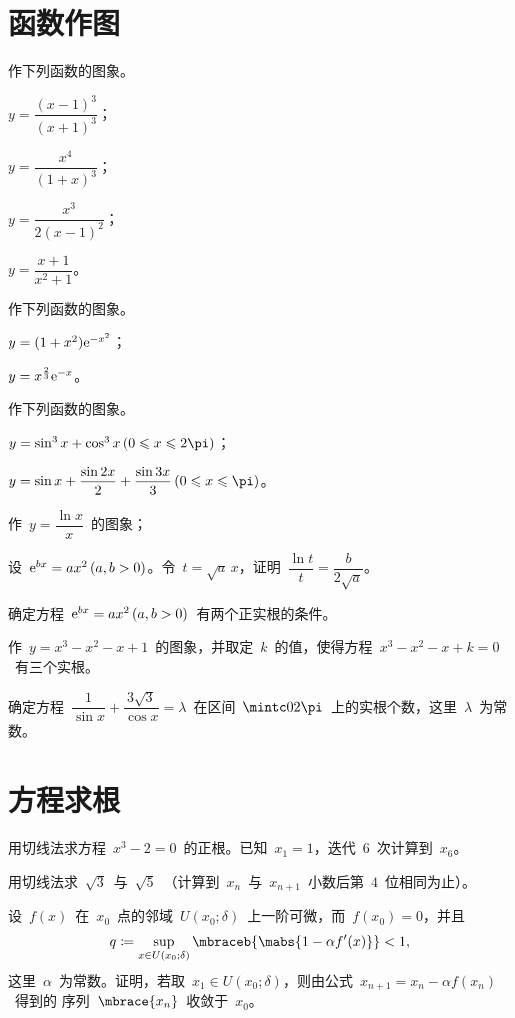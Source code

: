 \section{函数作图}
\begin{exercise}
\item 作下列函数的图象。
\begin{exlistcols}[4]
  \item $y=\dfrac{(x-1)^3}{(x+1)^3}$；
  \item $y=\dfrac{x^4}{(1+x)^3}$；
  \item $y=\dfrac{x^3}{2(x-1)^2}$；
  \item $y=\dfrac{x+1}{x^2+1}$。
\end{exlistcols}
\item 作下列函数的图象。
\begin{exlistcols}
  \item $y=(1+x^2)\mathrm e^{-x^2}$；
  \item $y=x^{\frac23}\mathrm e^{-x}$。
\end{exlistcols}
\item 作下列函数的图象。
\begin{exlistcols}
  \item $y=\sin^3x+\cos^3x\mcond{0\leq x\leq 2\pi}$；
  \item $y=\sin x+\dfrac{\sin2x}2+\dfrac{\sin3x}3\mcond{0\leq x\leq \pi}$。
\end{exlistcols}
\item\begin{exlist}
  \item 作~$y=\dfrac{\ln x}x$~的图象；
  \item 设~$\me^{bx}=ax^2\mcond{a,b>0}$。令~$t=\sqrt a\,x$，证明~$\dfrac{\ln t}t=\dfrac b{2\sqrt a}$。
  \item 确定方程~$\me^{bx}=ax^2\mcond{a,b>0}$~有两个正实根的条件。
\end{exlist}
\item 作~$y=x^3-x^2-x+1$~的图象，并取定~$k$~的值，使得方程~$x^3-x^2-x+k=0$~有三个实根。
\item 确定方程~$\dfrac1{\sin x}+\dfrac{3\sqrt 3}{\cos x}=\lambda$~在区间~$\mintc 0{2\pi}$~上的实根个数，这里~$\lambda$~为常数。
\end{exercise}

\section{方程求根}
\begin{exercise}
\item 用切线法求方程~$x^3-2=0$~的正根。已知~$x_1=1$，迭代~$6$~次计算到~$x_6$。
\item 用切线法求~$\sqrt 3$~与~$\sqrt 5$~（计算到~$x_n$~与~$x_{n+1}$~小数后第~$4$~位相同为止）。
\item 设~$f(x)$~在~$x_0$~点的邻域~$U(x_0;\delta)$~上一阶可微，而~$f(x_0)=0$，并且
\[
  q\coloneq\sup_{x\in U(x_0;\delta)}\mbraceb{\mabs{1-\alpha f'(x)}}<1,
\]
这里~$\alpha$~为常数。证明，若取~$x_1\in U(x_0;\delta)$，则由公式~$x_{n+1}=x_n-\alpha f(x_n)$~得到的
序列~$\mbrace{x_n}$~收敛于~$x_0$。
\end{exercise}


